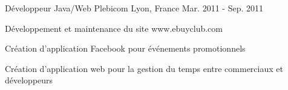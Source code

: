\begin{cventries}
  \cventry
    {Développeur Java/Web} %
    {Plebicom} %
    {Lyon, France} %
    {Mar. 2011 - Sep. 2011} %
    {
      \begin{cvitems} %
        \item {Développement et maintenance du site www.ebuyclub.com}
        \item {Création d'application Facebook pour événements promotionnels}
        \item {Création d'application web pour la gestion du temps entre commerciaux et développeurs}
      \end{cvitems}
    }

\end{cventries}
